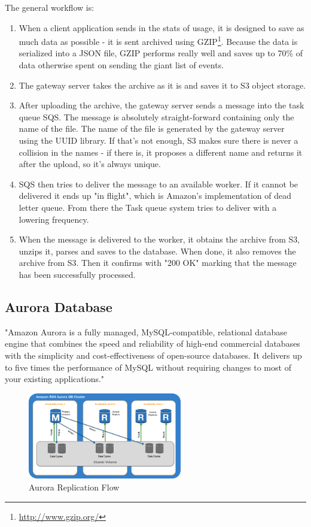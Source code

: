 \newpage

The general workflow is:

\begin{enumerate}
	\item When a client application sends in the stats of usage, it is designed to save as much data as possible - it is sent archived using GZIP\footnote{\url{http://www.gzip.org/}}. Because the data is serialized into a JSON file, GZIP performs really well and saves up to 70\% of data otherwise spent on sending the giant list of events.
	\item The gateway server takes the archive as it is and saves it to S3 object storage.
	\item After uploading the archive, the gateway server sends a message into the task queue SQS. The message is absolutely straight-forward containing only the name of the file. The name of the file is generated by the gateway server using the UUID library. If that's not enough, S3 makes sure there is never a collision in the names - if there is, it proposes a different name and returns it after the upload, so it's always unique.
	\item SQS then tries to deliver the message to an available worker. If it cannot be delivered it ends up "in flight", which is Amazon's implementation of dead letter queue. From there the Task queue system tries to deliver with a lowering frequency.
	\item When the message is delivered to the worker, it obtains the archive from S3, unzips it, parses and saves to the database. When done, it also removes the archive from S3. Then it confirms with "200 OK" marking that the message has been successfully processed.
\end{enumerate}

\subsection{Aurora Database}

"Amazon Aurora is a fully managed, MySQL-compatible, relational database engine that combines the speed and reliability of high-end commercial databases with the simplicity and cost-effectiveness of open-source databases. It delivers up to five times the performance of MySQL without requiring changes to most of your existing applications." \cite{aurora}

\begin{figure}[!ht]
	\centering
	\includegraphics[width=0.6\textwidth]{figures/04_implementation/aurora}
    \caption{Aurora Replication Flow}
\end{figure}

